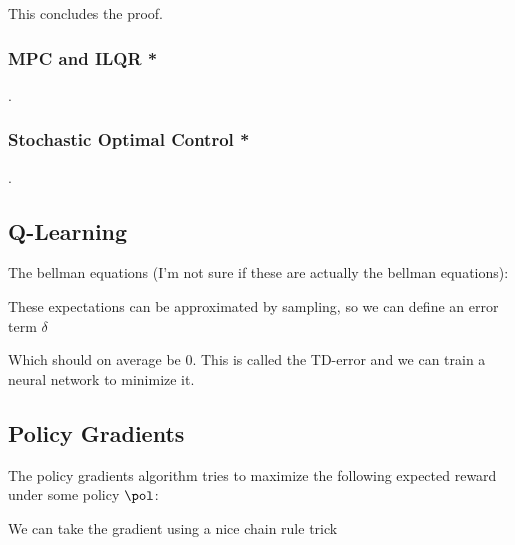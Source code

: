\documentclass[12pt]{article}
\begin{document}

This concludes the proof.

\subsubsection{MPC and ILQR *}
.
\subsubsection{Stochastic Optimal Control *}
.
\subsection{Q-Learning}

The bellman equations (I'm not sure if these are actually the bellman equations):


These expectations can be approximated by sampling, so we can define an error term $\delta$


Which should on average be 0. This is called the TD-error and we can train a neural network to minimize it.

\subsection{Policy Gradients}

The policy gradients algorithm tries to maximize the following expected reward under some policy $\pol$:


We can take the gradient using a nice chain rule trick

\end{document}
